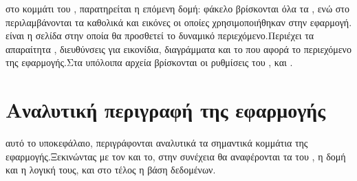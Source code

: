  στο κομμάτι του , παρατηρείται η επόμενη δομή:
 φάκελο  βρίσκονται όλα τα , ενώ στο  περιλαμβάνονται τα καθολικά  και εικόνες οι οποίες χρησιμοποιήθηκαν στην εφαρμογή.\\
  είναι η σελίδα στην οποία θα προσθετεί το δυναμικό περιεχόμενο.Περιέχει τα απαραίτητα , διευθύνσεις για εικονίδια, διαγράμματα και το  που αφορά το περιεχόμενο της εφαρμογής.Στα υπόλοιπα αρχεία βρίσκονται οι ρυθμίσεις του ,  και .
\section{Αναλυτική περιγραφή της εφαρμογής}
 αυτό το υποκεφάλαιο, περιγράφονται αναλυτικά τα σημαντικά κομμάτια της εφαρμογής.Ξεκινώντας με τον  και το, στην συνέχεια θα αναφέρονται τα  του , η δομή και η λογική τους, και στο τέλος η βάση δεδομένων.

